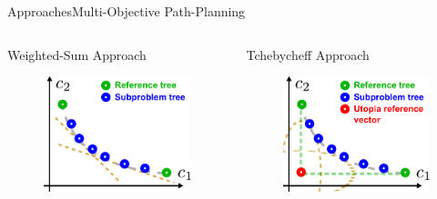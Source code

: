 \begin{frame}{Approaches}{Multi-Objective Path-Planning}
	
	\begin{columns}
		\begin{block}{Weighted-Sum Approach}
		\begin{figure}[t]
			\centering
			\includegraphics[width=\linewidth]{figure/MORRF_weighted_sum}
		\end{figure}
	    \end{block}
		\begin{block}{Tchebycheff Approach}
		\begin{figure}[t]
			\centering
			\includegraphics[width=\linewidth]{figure/MORRF_tchebycheff}

\end{figure}
\end{block}
\end{columns}
\end{frame}
